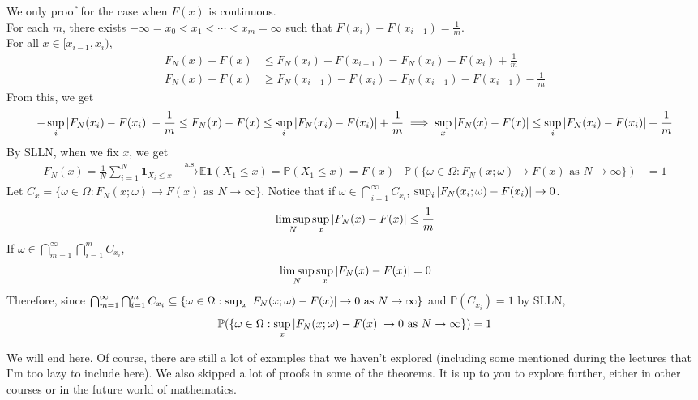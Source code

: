 \documentclass{huhtakm-template-book}
\newcommand{\prob}{\mathbb{P}}
\newcommand{\expect}{\mathbb{E}}
\begin{document}
\begin{proofing}
    We only proof for the case when $F(x)$ is continuous.\\
    For each $m$, there exists $-\infty=x_{0}<x_{1}<\cdots<x_{m}=\infty$ such that $F(x_{i})-F(x_{i-1})=\frac{1}{m}$.\\
    For all $x\in[x_{i-1},x_{i})$,
    \begin{align*}
        F_{N}(x)-F(x)&\leq F_{N}(x_{i})-F(x_{i-1})=F_{N}(x_{i})-F(x_{i})+\frac{1}{m}\\
        F_{N}(x)-F(x)&\geq F_{N}(x_{i-1})-F(x_{i})=F_{N}(x_{i-1})-F(x_{i-1})-\frac{1}{m}
    \end{align*}
    From this, we get
    \begin{equation*}
        -\sup_{i}\left|{F_{N}(x_{i})-F(x_{i})}\right|-\frac{1}{m}\leq F_{N}(x)-F(x)\leq\sup_{i}\left|{F_{N}(x_{i})-F(x_{i})}\right|+\frac{1}{m}\implies\sup_{x}\left|{F_{N}(x)-F(x)}\right|\leq\sup_{i}\left|{F_{N}(x_{i})-F(x_{i})}\right|+\frac{1}{m}
    \end{equation*}
    By SLLN, when we fix $x$, we get
    \begin{align*}
        F_{N}(x)=\frac{1}{N}\sum_{i=1}^{N}\mathbf{1}_{X_{i}\leq x}&\xrightarrow{\text{a.s.}}\expect\mathbf{1}(X_{1}\leq x)=\prob(X_{1}\leq x)=F(x) & \prob(\{\omega\in\Omega:F_{N}(x;\omega)\to F(x)\text{ as }N\to\infty\})&=1
    \end{align*}
    Let $C_{x}=\{\omega\in\Omega:F_{N}(x;\omega)\to F(x)\text{ as }N\to\infty\}$. Notice that if $\omega\in\bigcap_{i=1}^{\infty}C_{x_{i}}$, $\sup_{i}\left|{F_{N}(x_{i};\omega)-F(x_{i})}\right|\to 0$.
    \begin{equation*}
        \limsup_{N}\sup_{x}\left|{F_{N}(x)-F(x)}\right|\leq\frac{1}{m}
    \end{equation*}
    If $\omega\in\bigcap_{m=1}^{\infty}\bigcap_{i=1}^{m}C_{x_{i}}$,
    \begin{equation*}
        \limsup_{N}\sup_{x}\left|{F_{N}(x)-F(x)}\right|=0
    \end{equation*}
    Therefore, since $\bigcap_{m=1}^{\infty}\bigcap_{i=1}^{m}C_{x_{i}}\subseteq\{\omega\in\Omega:\sup_{x}\left|{F_{N}(x;\omega)-F(x)}\right|\to 0\text{ as }N\to\infty\}$ and $\prob(C_{x_{i}})=1$ by SLLN,
    \begin{equation*}
        \prob(\{\omega\in\Omega:\sup_{x}\abs{F_{N}(x;\omega)-F(x)}\to 0\text{ as }N\to\infty\})=1
    \end{equation*}
\end{proofing}
We will end here. Of course, there are still a lot of examples that we haven't explored (including some mentioned during the lectures that I'm too lazy to include here). We also skipped a lot of proofs in some of the theorems. It is up to you to explore further, either in other courses or in the future world of mathematics.
\end{document}
